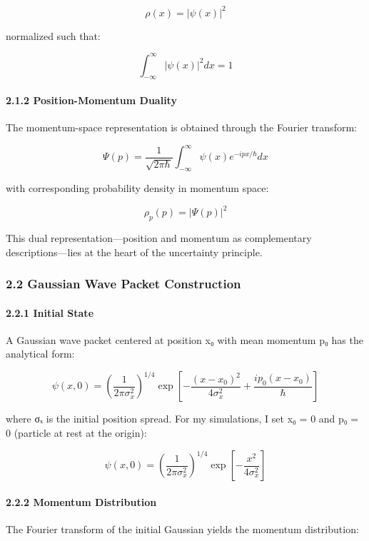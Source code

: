 \documentclass[
]{article}
\begin{document}
\[\rho(x) = |\psi(x)|^2\]

normalized such that:

\[\int_{-\infty}^{\infty} |\psi(x)|^2 dx = 1\]

\paragraph{2.1.2 Position-Momentum
Duality}\label{position-momentum-duality}

The momentum-space representation is obtained through the Fourier
transform:

\[\Psi(p) = \frac{1}{\sqrt{2\pi\hbar}}\int_{-\infty}^{\infty} \psi(x)e^{-ipx/\hbar}dx\]

with corresponding probability density in momentum space:

\[\rho_p(p) = |\Psi(p)|^2\]

This dual representation---position and momentum as complementary
descriptions---lies at the heart of the uncertainty principle.

\subsubsection{2.2 Gaussian Wave Packet
Construction}\label{gaussian-wave-packet-construction}

\paragraph{2.2.1 Initial State}\label{initial-state}

A Gaussian wave packet centered at position x₀ with mean momentum p₀ has
the analytical form:

\[\psi(x,0) = \left(\frac{1}{2\pi\sigma_x^2}\right)^{1/4} \exp\left[-\frac{(x-x_0)^2}{4\sigma_x^2} + \frac{ip_0(x-x_0)}{\hbar}\right]\]

where σₓ is the initial position spread. For my simulations, I set x₀ =
0 and p₀ = 0 (particle at rest at the origin):

\[\psi(x,0) = \left(\frac{1}{2\pi\sigma_x^2}\right)^{1/4} \exp\left[-\frac{x^2}{4\sigma_x^2}\right]\]

\paragraph{2.2.2 Momentum Distribution}\label{momentum-distribution}

The Fourier transform of the initial Gaussian yields the momentum
distribution:
\end{document}
